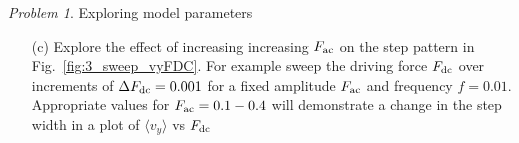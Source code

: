 \documentclass[preprint,showpacs,preprintnumbers,amsmath,amssymb,aps,prb]{revtex4-1}
\theoremstyle{remark}
\newtheorem{problem}{Problem}
\begin{document}
\begin{problem}{Exploring model parameters}
\begin{enumerate}
\item[(c)] Explore the effect of increasing increasing $F_{\rm ac}$ on the step pattern in Fig.~\ref{fig:3_sweep_vyFDC}.
  For example sweep the driving force $F_{\rm dc}$
  over increments of $\Delta F_{\rm dc} = 0.001$
  for a fixed amplitude $F_{\rm ac}$ and frequency $f=0.01$.
  Appropriate values for 
  $F_{\rm ac}=0.1 - 0.4$
  will demonstrate a change in the step width
  in a plot of $\langle v_y \rangle$ vs $F_{\rm dc}$
  
  \end{enumerate}
  \end{problem}
  
\end{document}
